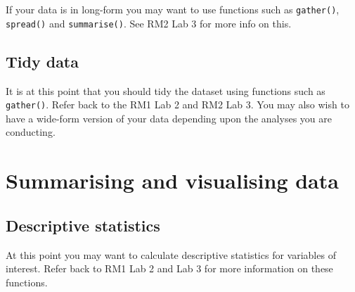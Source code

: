 \documentclass[]{book}
\newenvironment{Shaded}{\begin{snugshade}}{\end{snugshade}}
\newcommand{\CommentTok}[1]{\textcolor[rgb]{0.56,0.35,0.01}{\textit{#1}}}
\newcommand{\DataTypeTok}[1]{\textcolor[rgb]{0.13,0.29,0.53}{#1}}
\newcommand{\KeywordTok}[1]{\textcolor[rgb]{0.13,0.29,0.53}{\textbf{#1}}}
\newcommand{\NormalTok}[1]{#1}
\newcommand{\OperatorTok}[1]{\textcolor[rgb]{0.81,0.36,0.00}{\textbf{#1}}}
\newcommand{\OtherTok}[1]{\textcolor[rgb]{0.56,0.35,0.01}{#1}}
\newcommand{\StringTok}[1]{\textcolor[rgb]{0.31,0.60,0.02}{#1}}
\begin{document}
If your data is in long-form you may want to use functions such as \texttt{gather()}, \texttt{spread()} and \texttt{summarise()}. See RM2 Lab 3 for more info on this.

\hypertarget{tidy-data-1}{%
\subsection{Tidy data}\label{tidy-data-1}}

It is at this point that you should tidy the dataset using functions such as \texttt{gather()}. Refer back to the RM1 Lab 2 and RM2 Lab 3. You may also wish to have a wide-form version of your data depending upon the analyses you are conducting.

\hypertarget{summarising-and-visualising-data}{%
\section{Summarising and visualising data}\label{summarising-and-visualising-data}}

\hypertarget{descriptive-statistics}{%
\subsection{Descriptive statistics}\label{descriptive-statistics}}

At this point you may want to calculate descriptive statistics for variables of interest. Refer back to RM1 Lab 2 and Lab 3 for more information on these functions.

\begin{Shaded}
\end{Shaded}
\end{document}
